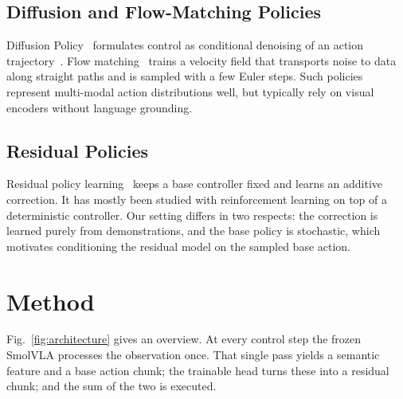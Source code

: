 \documentclass[conference]{IEEEtran}
\begin{document}
\subsection{Diffusion and Flow-Matching Policies}
Diffusion Policy~\cite{diffusionpolicy} formulates control as conditional denoising of an action trajectory~\cite{ddpm}. Flow matching~\cite{flowmatching} trains a velocity field that transports noise to data along straight paths and is sampled with a few Euler steps. Such policies represent multi-modal action distributions well, but typically rely on visual encoders without language grounding.

\subsection{Residual Policies}
Residual policy learning~\cite{residualpolicy,residualrl} keeps a base controller fixed and learns an additive correction. It has mostly been studied with reinforcement learning on top of a deterministic controller. Our setting differs in two respects: the correction is learned purely from demonstrations, and the base policy is stochastic, which motivates conditioning the residual model on the sampled base action.

\section{Method}

Fig.~\ref{fig:architecture} gives an overview. At every control step the frozen SmolVLA processes the observation once. That single pass yields a semantic feature and a base action chunk; the trainable head turns these into a residual chunk; and the sum of the two is executed.
\end{document}
